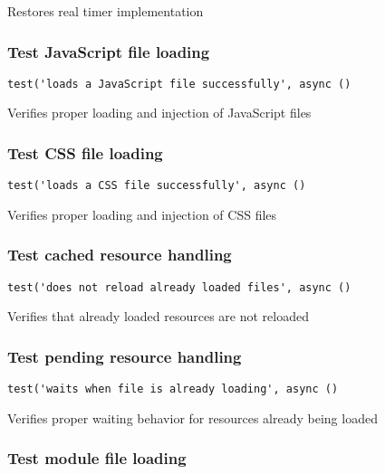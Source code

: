 \documentclass[a4paper]{article}
\begin{document}
Restores real timer implementation

\hypertarget{toc87}{}
\subsubsection{Test JavaScript file loading}

\begin{lstlisting}
test('loads a JavaScript file successfully', async ()
\end{lstlisting}

Verifies proper loading and injection of JavaScript files

\hypertarget{toc88}{}
\subsubsection{Test CSS file loading}

\begin{lstlisting}
test('loads a CSS file successfully', async ()
\end{lstlisting}

Verifies proper loading and injection of CSS files

\hypertarget{toc89}{}
\subsubsection{Test cached resource handling}

\begin{lstlisting}
test('does not reload already loaded files', async ()
\end{lstlisting}

Verifies that already loaded resources are not reloaded

\hypertarget{toc90}{}
\subsubsection{Test pending resource handling}

\begin{lstlisting}
test('waits when file is already loading', async ()
\end{lstlisting}

Verifies proper waiting behavior for resources already being loaded

\hypertarget{toc91}{}
\subsubsection{Test module file loading}
\end{document}

